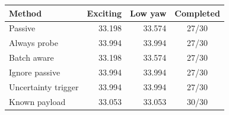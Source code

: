 \begin{tabular}{lrrc}\toprule
Method & Exciting & Low yaw & Completed\\\midrule
Passive & 33.198 & 33.574 & 27/30\\
Always probe & 33.994 & 33.994 & 27/30\\
Batch aware & 33.198 & 33.574 & 27/30\\
Ignore passive & 33.994 & 33.994 & 27/30\\
Uncertainty trigger & 33.994 & 33.994 & 27/30\\
Known payload & 33.053 & 33.053 & 30/30\\
\bottomrule\end{tabular}